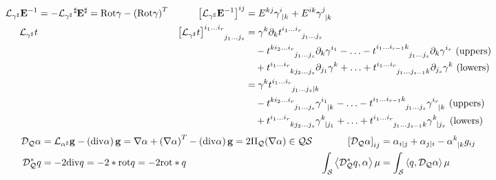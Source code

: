 \documentclass[a4paper,7pt]{scrartcl}
\newcommand{\surf}{\mathcal{S}}
\newcommand{\qts}{\mathcal{Q}\surf}
\newcommand{\rot}{\mathrm{rot}}
\renewcommand{\div}{\mathrm{div}}
\newcommand{\Rot}{\mathrm{Rot}}
\newcommand{\lie}{\mathcal{L}}
\newcommand{\dq}{\mathcal{D}_{\mathcal{Q}}}
\newcommand{\gb}{\mathbf{g}}
\newcommand{\Eb}{\mathbf{E}}
\begin{document}
\begin{align*}
  \lie_{\gamma^{\sharp}}\Eb^{-1} &= -\lie_{\gamma^{\sharp}}\tensor[^{\sharp}]{\Eb}{^{\sharp}} = \Rot\gamma - \left( \Rot\gamma \right)^{T}
        &\left[ \lie_{\gamma^{\sharp}}\Eb^{-1} \right]^{ij} &= E^{kj}\tensor{\gamma}{^{i}_{|k}} + E^{ik}\tensor{\gamma}{^{j}_{|k}}\\
  \lie_{\gamma^{\sharp}}t &
        &\tensor{\left[ \lie_{\gamma^{\sharp}}t \right]}{^{i_{1}\ldots i_{r}}_{j_{1}\ldots j_{s}}}
            &= \gamma^{k}\partial_{k}\tensor{t}{^{i_{1}\ldots i_{r}}_{j_{1}\ldots j_{s}}} \\
                        &&&\quad -\tensor{t}{^{ki_{2}\ldots i_{r}}_{j_{1}\ldots j_{s}}}\partial_{k}\gamma^{i_{1}}
                           - \ldots - \tensor{t}{^{i_{1}\ldots i_{r-1}k}_{j_{1}\ldots j_{s}}} \partial_{k}\gamma^{i_{r}} \text{ (uppers)}\\
                        &&&\quad +\tensor{t}{^{i_{1}\ldots i_{r}}_{kj_{2}\ldots j_{s}}}\partial_{j_{1}}\gamma^{k}
                           + \ldots + \tensor{t}{^{i_{1}\ldots i_{r}}_{j_{1}\ldots j_{s-1}k}}\partial_{j_{s}}\gamma^{k} \text{ (lowers)} \\
          &&&= \gamma^{k}\tensor{t}{^{i_{1}\ldots i_{r}}_{j_{1}\ldots j_{s}|k}} \\
                        &&&\quad -\tensor{t}{^{ki_{2}\ldots i_{r}}_{j_{1}\ldots j_{s}}}\tensor{\gamma}{^{i_{1}}_{|k}}
                          - \ldots - \tensor{t}{^{i_{1}\ldots i_{r-1}k}_{j_{1}\ldots j_{s}}}\tensor{\gamma}{^{i_{r}}_{|k}}  \text{ (uppers)}\\
                        &&&\quad +\tensor{t}{^{i_{1}\ldots i_{r}}_{kj_{2}\ldots j_{s}}}\tensor{\gamma}{^{k}_{|j_{1}}}
                           + \ldots + \tensor{t}{^{i_{1}\ldots i_{r}}_{j_{1}\ldots j_{s-1}k}}\tensor{\gamma}{^{k}_{|j_{s}}} \text{ (lowers)}
\end{align*}
\begin{align*}
  \dq\alpha &= \lie_{\alpha^{\sharp}}\gb - \left(\div\alpha\right)\gb 
              = \nabla\alpha + \left( \nabla\alpha \right)^{T} - \left(\div\alpha\right)\gb 
              = 2\Pi_{\mathcal{Q}}(\nabla\alpha) \in \qts
        &\left[\dq\alpha  \right]_{ij} &= \alpha_{i|j} + \alpha_{j|i} - \tensor{\alpha}{^{k}_{|k}}g_{ij}\\
  \dq^{*} q &= -2 \div q = - 2*\rot q = -2 \rot *q
          &\int_{\surf} \left\langle \dq^{*}q , \alpha \right\rangle \mu &= \int_{\surf} \left\langle q , \dq\alpha \right\rangle \mu
\end{align*}
  
\end{document}
